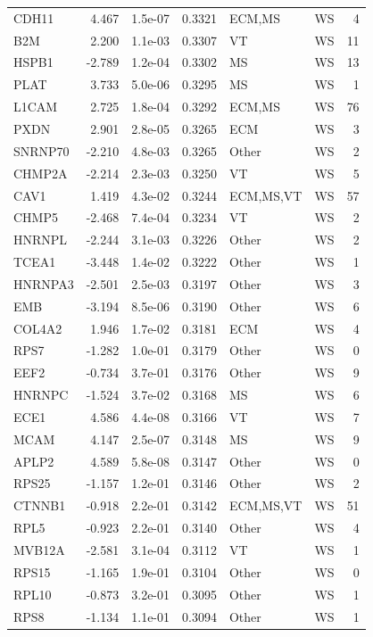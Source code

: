 \begin{table}[ht]
\begin{tabular}{lrlrllr}
  CDH11 & 4.467 & 1.5e-07 & 0.3321 & ECM,MS & WS & 4 \\ 
  B2M & 2.200 & 1.1e-03 & 0.3307 & VT & WS & 11 \\ 
  HSPB1 & -2.789 & 1.2e-04 & 0.3302 & MS & WS & 13 \\ 
  PLAT & 3.733 & 5.0e-06 & 0.3295 & MS & WS & 1 \\ 
  L1CAM & 2.725 & 1.8e-04 & 0.3292 & ECM,MS & WS & 76 \\ 
  PXDN & 2.901 & 2.8e-05 & 0.3265 & ECM & WS & 3 \\ 
  SNRNP70 & -2.210 & 4.8e-03 & 0.3265 & Other & WS & 2 \\ 
  CHMP2A & -2.214 & 2.3e-03 & 0.3250 & VT & WS & 5 \\ 
  CAV1 & 1.419 & 4.3e-02 & 0.3244 & ECM,MS,VT & WS & 57 \\ 
  CHMP5 & -2.468 & 7.4e-04 & 0.3234 & VT & WS & 2 \\ 
  HNRNPL & -2.244 & 3.1e-03 & 0.3226 & Other & WS & 2 \\ 
  TCEA1 & -3.448 & 1.4e-02 & 0.3222 & Other & WS & 1 \\ 
  HNRNPA3 & -2.501 & 2.5e-03 & 0.3197 & Other & WS & 3 \\ 
  EMB & -3.194 & 8.5e-06 & 0.3190 & Other & WS & 6 \\ 
  COL4A2 & 1.946 & 1.7e-02 & 0.3181 & ECM & WS & 4 \\ 
  RPS7 & -1.282 & 1.0e-01 & 0.3179 & Other & WS & 0 \\ 
  EEF2 & -0.734 & 3.7e-01 & 0.3176 & Other & WS & 9 \\ 
  HNRNPC & -1.524 & 3.7e-02 & 0.3168 & MS & WS & 6 \\ 
  ECE1 & 4.586 & 4.4e-08 & 0.3166 & VT & WS & 7 \\ 
  MCAM & 4.147 & 2.5e-07 & 0.3148 & MS & WS & 9 \\ 
  APLP2 & 4.589 & 5.8e-08 & 0.3147 & Other & WS & 0 \\ 
  RPS25 & -1.157 & 1.2e-01 & 0.3146 & Other & WS & 2 \\ 
  CTNNB1 & -0.918 & 2.2e-01 & 0.3142 & ECM,MS,VT & WS & 51 \\ 
  RPL5 & -0.923 & 2.2e-01 & 0.3140 & Other & WS & 4 \\ 
  MVB12A & -2.581 & 3.1e-04 & 0.3112 & VT & WS & 1 \\ 
  RPS15 & -1.165 & 1.9e-01 & 0.3104 & Other & WS & 0 \\ 
  RPL10 & -0.873 & 3.2e-01 & 0.3095 & Other & WS & 1 \\ 
  RPS8 & -1.134 & 1.1e-01 & 0.3094 & Other & WS & 1 \\ 

\end{tabular}
\end{table}
